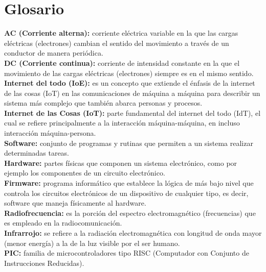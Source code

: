 \chapter{Glosario}

\textbf{AC (Corriente alterna):} corriente eléctrica variable en la que las cargas eléctricas (electrones) cambian el sentido del movimiento a través de un conductor de manera periódica.\\

\textbf{DC (Corriente continua):} corriente de intensidad constante en la que el movimiento de las cargas eléctricas (electrones) siempre es en el mismo sentido.\\

\textbf{Internet del todo (IoE):} es un concepto que extiende el énfasis de la internet de las cosas (IoT) en las comunicaciones de máquina a máquina para describir un sistema más complejo que también abarca personas y procesos.\cite{IOE} \\

\textbf{Internet de las Cosas (IoT):} parte fundamental del internet del todo (IdT), el cual se refiere principalmente a la interacción máquina-máquina, en incluso interacción máquina-persona.\\

\textbf{Software:} conjunto de programas y rutinas que permiten a un sistema realizar determinadas tareas.\\

\textbf{Hardware:} partes físicas que componen un sistema electrónico, como por ejemplo los componentes de un circuito electrónico.\\

\textbf{Firmware:} programa informático que establece la lógica de más bajo nivel que controla los circuitos electrónicos de un dispositivo de cualquier tipo, es decir, software que maneja físicamente al hardware.\\

\textbf{Radiofrecuencia:} es la porción del espectro electromagnético (frecuencias) que es empleado en la radiocomunicación.\\

\textbf{Infrarrojo:} se refiere a la radiación electromagnética con longitud de onda mayor (menor energía) a la de la luz visible por el ser humano.\\

\textbf{PIC:} familia de microcontroladores tipo RISC (Computador con Conjunto de Instrucciones Reducidas). \cite{PIC}\\

